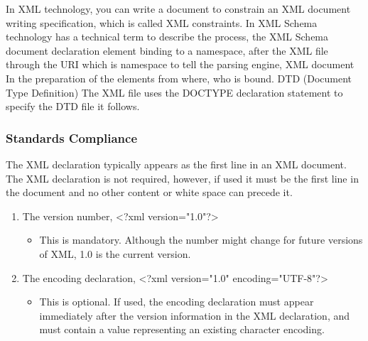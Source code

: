 In XML technology, you can write a document to constrain an XML document writing specification, which is called XML constraints. In XML Schema technology has a technical term to describe the process, the XML Schema document declaration element binding to a namespace, after the XML file through the URI which is namespace to tell the parsing engine, XML document In the preparation of the elements from where, who is bound.
DTD (Document Type Definition)
The XML file uses the DOCTYPE declaration statement to specify the DTD file it follows.



\subsubsection{Standards Compliance}
The XML declaration typically appears as the first line in an XML document. The XML declaration is not required, however, if used it must be the first line in the document and no other content or white space can precede it.
\begin{enumerate}
    \item The version number, <?xml version="1.0"?>
    \begin{itemize}
        \item This is mandatory. Although the number might change for future versions of XML, 1.0 is the current version.
    \end{itemize}
    \item The encoding declaration, <?xml version="1.0" encoding="UTF-8"?>
    \begin{itemize}
        \item This is optional. If used, the encoding declaration must appear immediately after the version information in the XML declaration, and must contain a value representing an existing character encoding.
    \end{itemize}
\end{enumerate}




